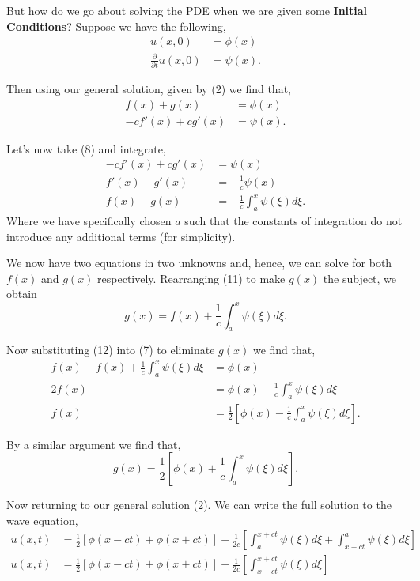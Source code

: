 \documentclass[11pt]{article}
\begin{document}
But how do we go about solving the PDE when we are given some \textbf{Initial Conditions}? Suppose we have the following,
\begin{align}
    u(x,0) &= \phi(x) \\
    \frac{\partial}{\partial t} u(x,0) &= \psi(x).
\end{align}

Then using our general solution, given by (2) we find that,
\begin{align}
    f(x) + g(x) &= \phi(x) \\
    -c f'(x) + c g'(x) &= \psi(x). 
\end{align}

Let's now take (8) and integrate,
\begin{align}
    -c f'(x) + c g'(x) &= \psi(x) \\[10pt]
    f'(x) - g'(x) &= -\frac{1}{c} \psi(x) \\[10pt]
    f(x) - g(x) &= -\frac{1}{c} \int_{a}^{x} \psi(\xi) d\xi.
\end{align}
Where we have specifically chosen $a$ such that the constants of integration do not introduce any additional terms (for simplicity).

We now have two equations in two unknowns and, hence, we can solve for both $f(x)$ and $g(x)$ respectively. Rearranging (11) to make $g(x)$ the subject, we obtain
\begin{equation}
    g(x) = f(x) +\frac{1}{c} \int_{a}^{x} \psi(\xi) d\xi.
\end{equation}

Now substituting (12) into (7) to eliminate $g(x)$ we find that,
\begin{align}
    f(x) + f(x) +\frac{1}{c} \int_{a}^{x} \psi(\xi) d\xi  &= \phi(x) \\[10pt]
    2 f(x) &= \phi(x) -\frac{1}{c} \int_{a}^{x} \psi(\xi) d\xi \\[10pt]
    f(x) &= \frac{1}{2} \left[ \phi(x) -\frac{1}{c} \int_{a}^{x} \psi(\xi) d\xi \right].
\end{align}

By a similar argument we find that,
\begin{equation}
    g(x) = \frac{1}{2} \left[ \phi(x) +\frac{1}{c} \int_{a}^{x} \psi(\xi) d\xi \right].    
\end{equation}

\newpage

Now returning to our general solution (2). We can write the full solution to the wave equation,
\begin{align}
    u(x,t) &= \frac{1}{2} \left[ \phi(x-ct) + \phi(x+ct) \right] + \frac{1}{2c} \left[ \int_{a}^{x+ct} \psi(\xi) d\xi + \int_{x-ct}^{a} \psi(\xi) d\xi \right] \\[10pt]
    u(x,t) &= \frac{1}{2} \left[ \phi(x-ct) + \phi(x+ct) \right] + \frac{1}{2c} \left[ \int_{x-ct}^{x+ct} \psi(\xi) d\xi \right]
\end{align}
\end{document}

